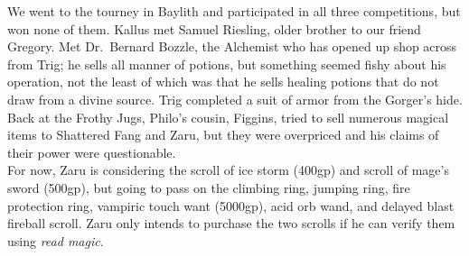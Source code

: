 \documentclass[letterpaper]{article}
\begin{document}
\noindent We went to the tourney in Baylith and participated in all three competitions, but won none of them. Kallus met Samuel Riesling, older brother to our friend Gregory.  Met Dr.\ Bernard Bozzle, the Alchemist who has opened up shop across from Trig; he sells all manner of potions, but something seemed fishy about his operation, not the least of which was that he sells healing potions that do not draw from a divine source.  Trig completed a suit of armor from the Gorger's hide. Back at the Frothy Jugs, Philo's cousin, Figgins, tried to sell numerous magical items to Shattered Fang and Zaru, but they were overpriced and his claims of their power were questionable.\\

\noindent For now, Zaru is considering the scroll of ice storm (400gp) and scroll of mage's sword (500gp), but going to pass on the climbing ring, jumping ring, fire protection ring, vampiric touch want (5000gp), acid orb wand, and delayed blast fireball scroll. Zaru only intends to purchase the two scrolls if he can verify them using \emph{read magic}.\\
\end{document}
